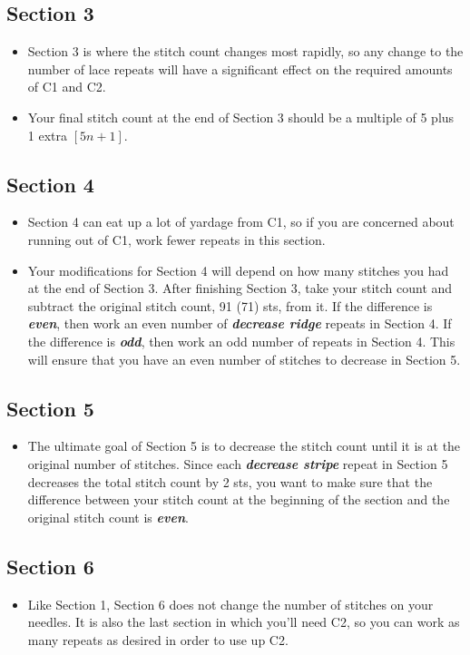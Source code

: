 \documentclass[12pt]{article}
\newcommand{\vocab}[1]{\emph{\textbf{#1}}} %
\begin{document}
\subsection*{Section 3}
\begin{itemize}
\item Section 3 is where the stitch count changes most rapidly, so any change to the number of lace repeats will have a significant effect on the required amounts of C1 and C2.
\item Your final stitch count at the end of Section 3 should be a multiple of 5 plus 1 extra $[5n+1]$.
\end{itemize}

\subsection*{Section 4}
\begin{itemize}
\item Section 4 can eat up a lot of yardage from C1, so if you are concerned about running out of C1, work fewer repeats in this section. 

\item Your modifications for Section 4 will depend on how many stitches you had at the end of Section 3. After finishing Section 3, take your stitch count and subtract the original stitch count, 91 (71) sts, from it. If the difference is \vocab{even}, then work an even number of \vocab{decrease ridge} repeats in Section 4. If the difference is \vocab{odd}, then work an odd number of repeats in Section 4. This will ensure that you have an even number of stitches to decrease in Section 5.
\end{itemize}

\subsection*{Section 5}
\begin{itemize}
\item The ultimate goal of Section 5 is to decrease the stitch count until it is at the original number of stitches. Since each \vocab{decrease stripe} repeat in Section 5 decreases the total stitch count by 2 sts, you want to make sure that the difference between your stitch count at the beginning of the section and the original stitch count is \vocab{even}.
\end{itemize}

\subsection*{Section 6}
\begin{itemize}
\item Like Section 1, Section 6 does not change the number of stitches on your needles. It is also the last section in which you'll need C2, so you can work as many repeats as desired in order to use up C2.
\end{itemize}
\end{document}

